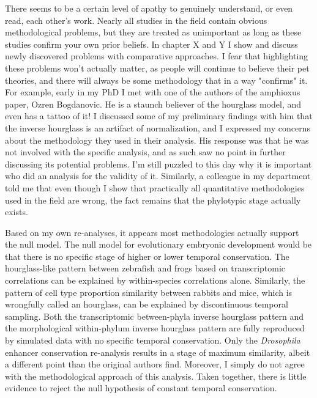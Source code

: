 There seems to be a certain level of apathy to genuinely understand, or even read, each other's work. Nearly all studies in the field contain obvious methodological problems, but they are treated as unimportant as long as these studies confirm your own prior beliefs. In chapter X and Y I show and discuss newly discovered problems with comparative approaches. I fear that highlighting these problems won't actually matter, as people will continue to believe their pet theories, and there will always be some methodology that in a way "confirms" it. For example, early in my PhD I met with one of the authors of the amphioxus paper, Ozren Bogdanovic. He is a staunch believer of the hourglass model, and even has a tattoo of it! I discussed some of my preliminary findings with him that the inverse hourglass is an artifact of normalization, and I expressed my concerns about the methodology they used in their analysis. His response was that he was not involved with the specific analysis, and as such saw no point in further discussing its potential problems. I'm still puzzled to this day why it is important who did an analysis for the validity of it. Similarly, a colleague in my department told me that even though I show that practically all quantitative methodologies used in the field are wrong, the fact remains that the phylotypic stage actually exists.

Based on my own re-analyses, it appears most methodologies actually support the null model. The null model for evolutionary embryonic development would be that there is no specific stage of higher or lower temporal conservation. The hourglass-like pattern between zebrafish and frogs based on transcriptomic correlations can be explained by within-species correlations alone. Similarly, the pattern of cell type proportion similarity between rabbits and mice, which is wrongfully called an hourglass, can be explained by discontinuous temporal sampling. Both the transcriptomic between-phyla inverse hourglass pattern and the morphological within-phylum inverse hourglass pattern are fully reproduced by simulated data with no specific temporal conservation. Only the \textit{Drosophila} enhancer conservation re-analysis results in a stage of maximum similarity, albeit a different point than the original authors find. Moreover, I simply do not agree with the methodological approach of this analysis. Taken together, there is little evidence to reject the null hypothesis of constant temporal conservation.

